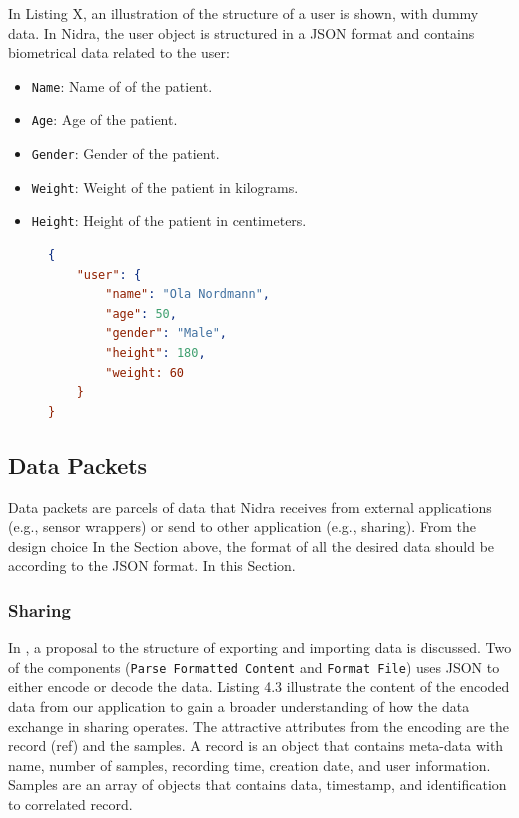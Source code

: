 In Listing X, an illustration of the structure of a user is shown, with  dummy data. In Nidra, the user object is structured in a JSON format and contains biometrical data related to the user: 
\begin{itemize}
    \item \verb|Name|: Name of of the patient.
    \item \verb|Age|: Age of the patient.
    \item \verb|Gender|: Gender of the patient.
    \item \verb|Weight|: Weight of the patient in kilograms.
    \item \verb|Height|: Height of the patient in centimeters.
\end{itemize}

\begin{figure}
\begin{lstlisting}[language=json, caption={My Caption}, captionpos=b]
{
    "user": {
        "name": "Ola Nordmann",
        "age": 50,
        "gender": "Male",
        "height": 180,
        "weight: 60
    }
}
\end{lstlisting}
\end{figure}


\subsection{Data Packets}\label{design:datapackets}
Data packets are parcels of data that Nidra receives from external applications (e.g., sensor wrappers) or send to other application (e.g., sharing). From the design choice In the Section above, the format of all the desired data should be according to the JSON format.  In this Section.

\subsubsection{Sharing}

In , a proposal to the structure of exporting and importing data is discussed. Two of the components (\verb|Parse Formatted Content| and \verb|Format File|) uses JSON to either encode or decode the data. Listing 4.3 illustrate the content of the encoded data from our application to gain a broader understanding of how the data exchange in sharing operates. The attractive attributes from the encoding are the record (ref) and the samples.  A record is an object that contains meta-data with name, number of samples, recording time, creation date, and user information. Samples are an array of objects that contains data, timestamp, and identification to correlated record. 

